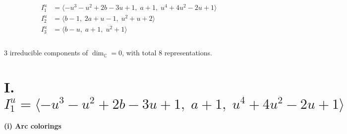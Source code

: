 \documentclass[1p]{elsarticle_modified}
\theoremstyle{definition}
\begin{document}
\begin{align*}
I^u_{1}&=\langle 
- u^3- u^2+2 b-3 u+1,\;a+1,\;u^4+4 u^2-2 u+1\rangle \\
I^u_{2}&=\langle 
b-1,\;2 a+u-1,\;u^2+u+2\rangle \\
I^u_{3}&=\langle 
b- u,\;a+1,\;u^2+1\rangle \\
\\
\end{align*}
\raggedright * 3 irreducible components of $\dim_{\mathbb{C}}=0$, with total 8 representations.\\
\newpage
\renewcommand{\arraystretch}{1}
\centering \section*{I. $I^u_{1}= \langle - u^3- u^2+2 b-3 u+1,\;a+1,\;u^4+4 u^2-2 u+1 \rangle$}
\flushleft \textbf{(i) Arc colorings}\\
\end{document}
